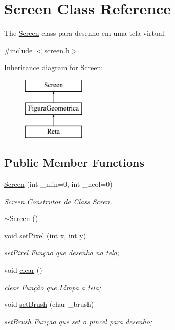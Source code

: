 \hypertarget{class_screen}{}\section{Screen Class Reference}
\label{class_screen}


The \mbox{\hyperlink{class_screen}{Screen}} class para desenho em uma tela virtual.  




{\ttfamily \#include $<$screen.\+h$>$}

Inheritance diagram for Screen\+:\begin{figure}[H]
\begin{center}
\leavevmode
\includegraphics[height=3.000000cm]{class_screen}
\end{center}
\end{figure}
\subsection*{Public Member Functions}
\begin{DoxyCompactItemize}
\item 
\mbox{\hyperlink{class_screen_ac0cb3fd57e5eb225d9756b8eb6311833}{Screen}} (int \+\_\+nlin=0, int \+\_\+ncol=0)
\begin{DoxyCompactList}\small\item\em \mbox{\hyperlink{class_screen}{Screen}} Construtor da Class Scren. \end{DoxyCompactList}\item 
\mbox{\hyperlink{class_screen_a4243bc17596af96415b09ac48205676d}{$\sim$\+Screen}} ()
\item 
void \mbox{\hyperlink{class_screen_ae6bea81c57a22d226507c3c26fa95ee0}{set\+Pixel}} (int x, int y)
\begin{DoxyCompactList}\small\item\em set\+Pixel Função que desenha na tela; \end{DoxyCompactList}\item 
void \mbox{\hyperlink{class_screen_a35e74266b2a04e37b354ceff7a5f1031}{clear}} ()
\begin{DoxyCompactList}\small\item\em clear Função que Limpa a tela; \end{DoxyCompactList}\item 
void \mbox{\hyperlink{class_screen_aebc4eb6cb5acf15a0f04c1494622ab23}{set\+Brush}} (char \+\_\+brush)
\begin{DoxyCompactList}\small\item\em set\+Brush Função que set o pincel para desenho; \end{DoxyCompactList}\end{DoxyCompactItemize}
